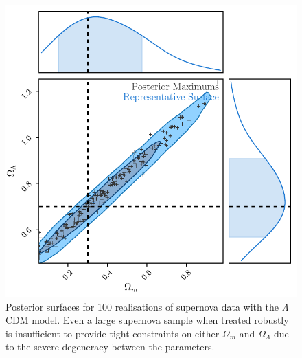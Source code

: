 \documentclass[a4paper,fleqn,usenatbib]{mnras}
\begin{document}
\begin{figure}
	\begin{center}
		\includegraphics[width=\columnwidth]{simpleApproximateModelOl.pdf}
	\end{center}
	\caption{Posterior surfaces for 100 realisations of supernova data with the $\Lambda$CDM model. Even a large supernova sample when treated robustly is insufficient to provide tight constraints on either $\Omega_m$ and $\Omega_\Lambda$ due to the severe degeneracy between the parameters.}
	\label{fig:simple_ol}
\end{figure}
\end{document}
